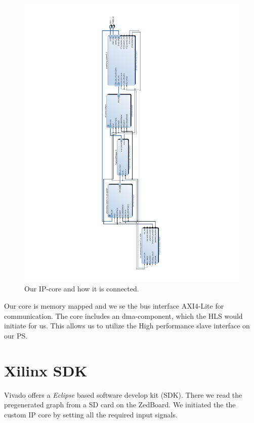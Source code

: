 \begin{figure}[!ht]
\includegraphics[scale=0.7]{Figures/design_1}
\caption{Our IP-core and how it is connected.}
\label{fig:vivadoImple}
\end{figure}



Our core is memory mapped and we se the bus interface AXI4-Lite for communication. The core includes an dma-component, which the HLS would initiate for us. This allows us to utilize the High performance slave interface on our PS.


\section{Xilinx SDK}
Vivado offers a \textit{Eclipse} based software develop kit (SDK). There we read the pregenerated graph from a SD card on the ZedBoard. We initiated the the custom IP core by setting all the required input signals.




